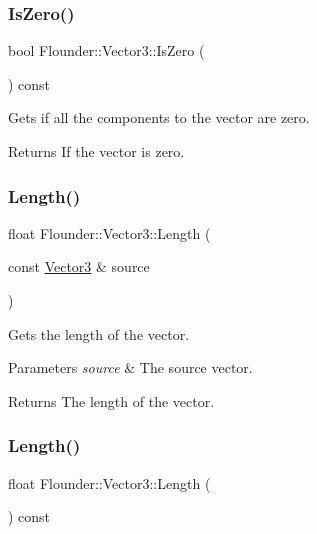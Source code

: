 \subsubsection{\texorpdfstring{Is\+Zero()}{IsZero()}}
{\footnotesize\ttfamily bool Flounder\+::\+Vector3\+::\+Is\+Zero (\begin{DoxyParamCaption}{ }\end{DoxyParamCaption}) const}



Gets if all the components to the vector are zero. 

\begin{DoxyReturn}{Returns}
If the vector is zero. 
\end{DoxyReturn}
\mbox{\label{class_flounder_1_1_vector3_a22ede14d4ba956bf16dee2b32284d083}} 
\subsubsection{\texorpdfstring{Length()}{Length()}\hspace{0.1cm}{\footnotesize\ttfamily [1/2]}}
{\footnotesize\ttfamily float Flounder\+::\+Vector3\+::\+Length (\begin{DoxyParamCaption}\item[{const \hyperlink{class_flounder_1_1_vector3}{Vector3} \&}]{source }\end{DoxyParamCaption})\hspace{0.3cm}{\ttfamily [static]}}



Gets the length of the vector. 


\begin{DoxyParams}{Parameters}
{\em source} & The source vector. \\
\hline
\end{DoxyParams}
\begin{DoxyReturn}{Returns}
The length of the vector. 
\end{DoxyReturn}
\mbox{\label{class_flounder_1_1_vector3_a0be693418e56fc0fb9a3425985a4771f}} 
\subsubsection{\texorpdfstring{Length()}{Length()}\hspace{0.1cm}{\footnotesize\ttfamily [2/2]}}
{\footnotesize\ttfamily float Flounder\+::\+Vector3\+::\+Length (\begin{DoxyParamCaption}{ }\end{DoxyParamCaption}) const}



